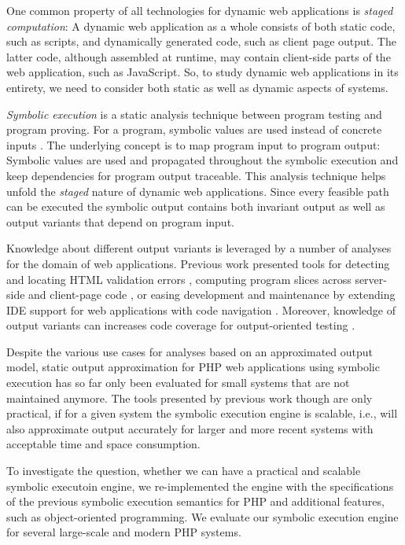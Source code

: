 \documentclass[sigconf]{acmart}
\begin{document}
One common property of all technologies for dynamic web applications is
\emph{staged computation}: A dynamic web application as a whole
consists of both static code, such as scripts, and dynamically generated code,
such as client page output. The latter code, although assembled at
runtime, may contain client-side parts of the web application, such as
JavaScript. So, to study dynamic web applications in its entirety, we need to
consider both static as well as dynamic aspects of systems.

\emph{Symbolic execution} is a static analysis technique between program testing
and program proving. For a program, symbolic values are
used instead of concrete inputs \cite{Darringer1978,King1976}. The underlying
concept is to map program input to program output: Symbolic values are used and
propagated throughout the symbolic execution and keep dependencies for program
output traceable. This analysis technique helps unfold the \emph{staged} nature
of dynamic web applications. Since every feasible path can be executed the
symbolic output contains both invariant output as well as output variants that
depend on program input.

Knowledge about different output variants is leveraged by a number of
analyses for the domain of web applications. Previous work presented tools
for detecting and locating HTML validation errors
\cite{Nguyen:2011:AFH:2190078.2190142}, computing program slices across
server-side and client-page code \cite{Nguyen:2015:CPS:2786805.2786872}, or
easing development and maintenance by extending IDE support for web applications
with code navigation \cite{Nguyen:2015:VIS:2819009.2819140,Nguyen:2014:BCG:2635868.2635928}.
Moreover, knowledge of output variants can increases code coverage for
output-oriented testing \cite{Alshahwan2011}.

Despite the various use cases for analyses based on an approximated output
model, static output approximation for PHP web applications using symbolic
execution has so far only been evaluated for small systems that are not
maintained anymore. The tools presented by previous work
\cite{Nguyen:2015:VIS:2819009.2819140,Nguyen:2014:BCG:2635868.2635928,Nguyen:2015:CPS:2786805.2786872,Nguyen:2011:AFH:2190078.2190142}
though are only practical, if for a given system the symbolic execution engine
is scalable, i.e., will also approximate output accurately for larger and more
recent systems with acceptable time and space consumption.

To investigate the question, whether we can have a practical and scalable
symbolic executoin engine, we re-implemented the engine with the specifications
of the previous symbolic execution semantics \cite{Nguyen:2014:BCG:2635868.2635928} for PHP and additional features, such
as object-oriented programming. We evaluate our
symbolic execution engine for several large-scale and modern PHP systems.
\end{document}
